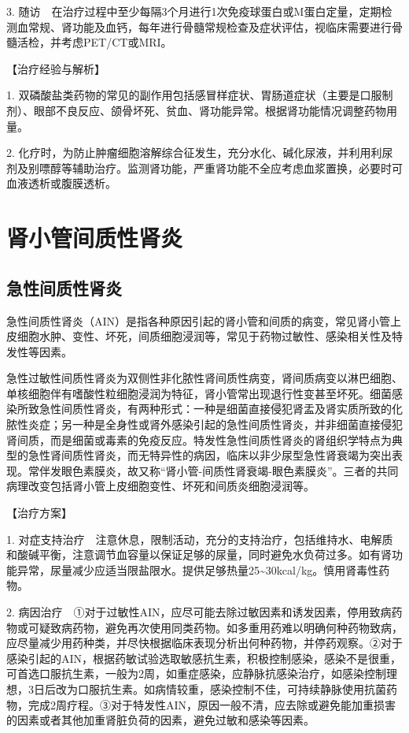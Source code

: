 3.
随访　在治疗过程中至少每隔3个月进行1次免疫球蛋白或M蛋白定量，定期检测血常规、肾功能及血钙，每年进行骨髓常规检查及症状评估，视临床需要进行骨髓活检，并考虑PET/CT或MRI。

【治疗经验与解析】

1.
双磷酸盐类药物的常见的副作用包括感冒样症状、胃肠道症状（主要是口服制剂）、眼部不良反应、颌骨坏死、贫血、肾功能异常。根据肾功能情况调整药物用量。

2.
化疗时，为防止肿瘤细胞溶解综合征发生，充分水化、碱化尿液，并利用利尿剂及别嘌醇等辅助治疗。监测肾功能，严重肾功能不全应考虑血浆置换，必要时可血液透析或腹膜透析。

\section{肾小管间质性肾炎}

\subsection{急性间质性肾炎}

急性间质性肾炎（AIN）是指各种原因引起的肾小管和间质的病变，常见肾小管上皮细胞水肿、变性、坏死，间质细胞浸润等，常见于药物过敏性、感染相关性及特发性等因素。

急性过敏性间质性肾炎为双侧性非化脓性肾间质性病变，肾间质病变以淋巴细胞、单核细胞伴有嗜酸性粒细胞浸润为特征，肾小管常出现退行性变甚至坏死。细菌感染所致急性间质性肾炎，有两种形式：一种是细菌直接侵犯肾盂及肾实质所致的化脓性炎症；另一种是全身性或肾外感染引起的急性间质性肾炎，并非细菌直接侵犯肾间质，而是细菌或毒素的免疫反应。特发性急性间质性肾炎的肾组织学特点为典型的急性肾间质性肾炎，而无特异性的病因，临床以非少尿型急性肾衰竭为突出表现。常伴发眼色素膜炎，故又称“肾小管-间质性肾衰竭-眼色素膜炎”。三者的共同病理改变包括肾小管上皮细胞变性、坏死和间质炎细胞浸润等。

【治疗方案】

1.
对症支持治疗　注意休息，限制活动，充分的支持治疗，包括维持水、电解质和酸碱平衡，注意调节血容量以保证足够的尿量，同时避免水负荷过多。如有肾功能异常，尿量减少应适当限盐限水。提供足够热量25\textasciitilde{}30kcal/kg。慎用肾毒性药物。

2.
病因治疗　①对于过敏性AIN，应尽可能去除过敏因素和诱发因素，停用致病药物或可疑致病药物，避免再次使用同类药物。如多重用药难以明确何种药物致病，应尽量减少用药种类，并尽快根据临床表现分析出何种药物，并停药观察。②对于感染引起的AIN，根据药敏试验选取敏感抗生素，积极控制感染，感染不是很重，可首选口服抗生素，一般为2周，如重症感染，应静脉抗感染治疗，如感染控制理想，3日后改为口服抗生素。如病情较重，感染控制不佳，可持续静脉使用抗菌药物，完成2周疗程。③对于特发性AIN，原因一般不清，应去除或避免能加重损害的因素或者其他加重肾脏负荷的因素，避免过敏和感染等因素。

